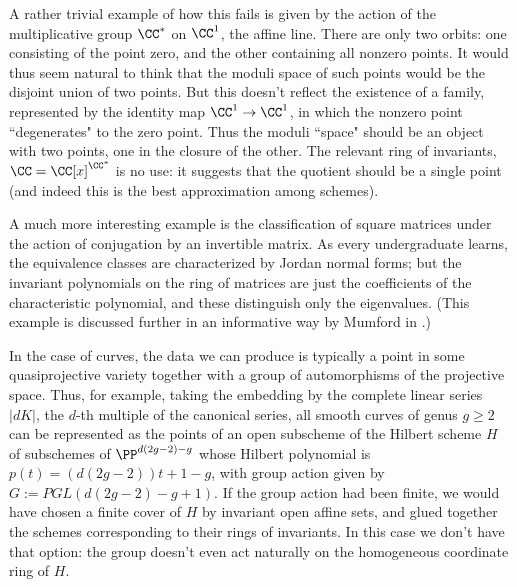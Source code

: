 A rather trivial example of how this fails is given by the action of the multiplicative group $\CC^*$ on $\CC^1$, the
affine line. There are only two orbits: one consisting of the point zero, and the other containing all nonzero points. It would thus seem natural to think that the moduli space of such points would be the disjoint union of two points. But this doesn't reflect the existence of a family, represented by the 
identity map $\CC^1 \to \CC^1$, in which the nonzero point ``degenerates" to the zero point. Thus the moduli ``space" should be an object with two points, one in the closure of the other. The relevant ring of invariants, $\CC = \CC[x]^{\CC^*}$ is no use: it suggests that the quotient should be a single point (and indeed this is the best approximation among schemes).

A much more interesting example is the classification of square matrices under the action of conjugation by an invertible matrix. As every undergraduate learns, the equivalence classes are characterized by Jordan normal forms; but the invariant polynomials on the ring of matrices are just the coefficients of the characteristic polynomial, and these distinguish only the eigenvalues. (This example is discussed further in an informative way by Mumford in \cite{Mumford-Suominen}.)

In the case of curves, the data we can produce is typically a point in some quasiprojective variety together with a group of automorphisms of the projective space. Thus, for example, taking the embedding by the complete linear series $|dK|$, the $d$-th multiple of the canonical series, all smooth curves of genus $g\geq 2$ can be represented as the points of an open subscheme of the Hilbert scheme $H$ of subschemes of $\PP^{d(2g-2)-g}$ whose Hilbert polynomial is $p(t) = (d(2g-2))t+1-g$, with group action given by
$G := PGL(d(2g-2)-g+1)$. If the group action had been finite, we would have chosen a finite cover of $H$ by invariant open affine sets, and glued together the schemes corresponding to their rings of invariants. In this case we don't have that option: the group doesn't even act naturally on the homogeneous coordinate ring
of $H$. 

